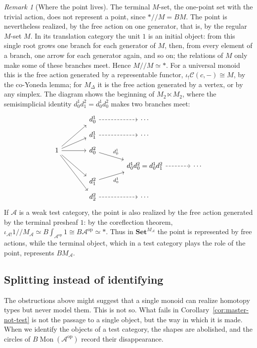 \documentclass[11pt]{amsart}
\theoremstyle{definition}
\theoremstyle{remark}
\newtheorem{remark}[teo]{Remark}
\numberwithin{figure}{section}%
\newcommand{\CC}{\mathcal{C}}
\DeclareMathOperator{\Mon}{Mon}
\newcommand{\Set}{\mathbf{Set}}
\newcommand{\op}{\mathrm{op}}
\newcommand{\A}{\mathcal{A}}
\begin{document}
\begin{remark}[Where the point lives]
\label{rem:point}
The terminal $M$-set, the one-point set with the trivial action, does not represent a point, since $*/\!/M=BM$. The point is nevertheless realized, by the free action on one generator, that is, by the regular $M$-set $M$. In its translation category the unit $1$ is an initial object: from this single root grows one branch for each generator of $M$, then, from every element of a branch, one arrow for each generator again, and so on; the relations of $M$ only make some of these branches meet. Hence $M/\!/M\simeq*$. For a universal monoid this is the free action generated by a representable functor, $\iota_!\CC(c,-)\cong M$, by the co-Yoneda lemma; for $M_\Delta$ it is the free action generated by a vertex, or by any simplex. The diagram shows the beginning of $M_2\ltimes M_2$, where the semisimplicial identity $d^1_0d^2_1=d^1_0d^2_0$ makes two branches meet:
\[
\begin{tikzcd}[row sep=tiny, column sep=large]
 & d^1_0 \arrow[r,dashed] & \cdots \\
 & d^1_1 \arrow[r,dashed] & \cdots \\
1 \arrow[uur] \arrow[ur] \arrow[r] \arrow[ddr] \arrow[dddr] & d^2_0 \arrow[dr,"d^1_0"] & \\
 & & d^1_0d^2_0=d^1_0d^2_1 \arrow[r,dashed] & \cdots \\
 & d^2_1 \arrow[ur,"d^1_0"'] & \\
 & d^2_2 \arrow[r,dashed] & \cdots
\end{tikzcd}
\]
If $\A$ is a weak test category, the point is also realized by the free action generated by the terminal presheaf $1$: by the coreflection theorem, $\iota_{\A!}1/\!/M_\A\simeq B\!\int_{\A^{\op}}1\cong B\A^{\op}\simeq*$. Thus in $\Set^{M_\A}$ the point is represented by free actions, while the terminal object, which in a test category plays the role of the point, represents $BM_\A$.
\end{remark}

\subsection{Splitting instead of identifying}
\label{subsec:test-monoid}

The obstructions above might suggest that a single monoid can realize homotopy types but never model them. This is not so. What fails in Corollary~\ref{cor:master-not-test} is not the passage to a single object, but the way in which it is made. When we identify the objects of a test category, the shapes are abolished, and the circles of $B\Mon(\A^{\op})$ record their disappearance.
\end{document}
